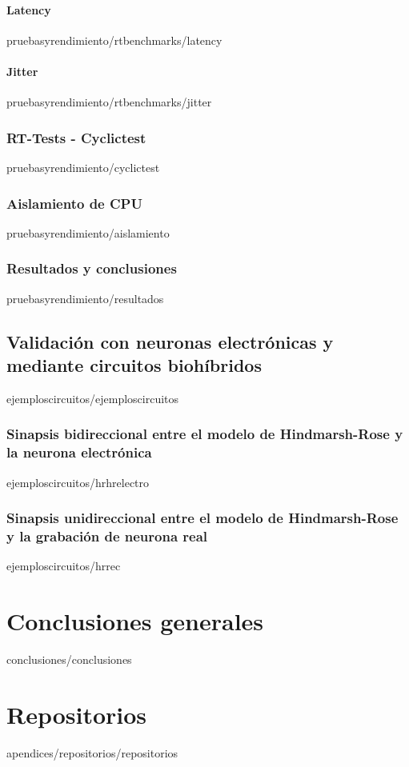 \documentclass[epsbased,copyright,final,printable,covers,extendedindex,firstnumbered,tfg,gnuplot]{tfgtfmthesisuam}
\begin{document}
     \subsubsection{Latency\label{SSS:LATENCY}}{pruebasyrendimiento/rtbenchmarks/latency}
     \subsubsection{Jitter\label{SSS:JITTER}}{pruebasyrendimiento/rtbenchmarks/jitter}
    \subsection{RT-Tests - Cyclictest\label{SS:CYCLICTEST}}{pruebasyrendimiento/cyclictest}
    \subsection{Aislamiento de CPU\label{SS:AISLAMIENTOCPU}}{pruebasyrendimiento/aislamiento}
    \subsection{Resultados y conclusiones\label{SS:RESULTADOS}}{pruebasyrendimiento/resultados}
  \section{Validación con neuronas electrónicas y mediante circuitos biohíbridos\label{SEC:EJEMPLOSCIRCUITOSBIOHIBRIDOS}}{ejemploscircuitos/ejemploscircuitos}
    \subsection{Sinapsis bidireccional entre el modelo de Hindmarsh-Rose y la neurona electrónica\label{SS:HRHRELECTRO}}{ejemploscircuitos/hrhrelectro}
    \subsection{Sinapsis unidireccional entre el modelo de Hindmarsh-Rose y la grabación de neurona real\label{SS:HRREC}}{ejemploscircuitos/hrrec}

\chapter{Conclusiones generales\label{CAP:CONCLUSIONES}}{conclusiones/conclusiones}


\appendix

\chapter{Repositorios\label{CAP:REPOSITORIOSREPO}}{apendices/repositorios/repositorios}
\end{document}
